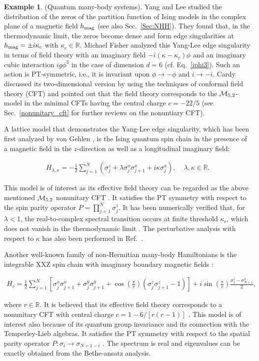 \documentclass{tADP2e}
\theoremstyle{plain}
\newcommand{\eqn}[1]{
\begin{eqnarray}
	#1
\end{eqnarray}
}
\theoremstyle{plain}
\theoremstyle{definition}
\newtheorem{example}{Example}[section]
\newcommand{\exmp}[1]{
\begin{example}
	#1
\end{example}
}
\begin{document}
\exmp{\label{phmany}(Quantum many-body systems).
Yang and Lee studied the distribution of the zeros of the partition function of Ising models in the complex plane of a magnetic field $h_{\rm mag}$ \cite{LTD52} (see also Sec.~\ref{Sec:NHH}). They found that, in the thermodynamic limit, the zeros become dense and form edge singularities at $h_{\rm mag}=\pm i\kappa_c$ with $\kappa_c\in{\mathbb R}$. Michael Fisher analyzed this Yang-Lee edge singularity in terms of field theory with an imaginary field $-i(\kappa-\kappa_c)\phi$ and an imaginary cubic interaction $ig\phi^3$ in the case of dimension $d=6$ \cite{MEF78} (cf. Eq.~\eqref{iphi3}). Such an action is PT-symmetric, i.e., it is invariant upon $\phi\to-\phi$ and $i\to -i$. Cardy discussed its two-dimensional version by using the techniques of conformal field theory (CFT) and pointed out that the field theory corresponds to the ${\cal M}_{5,2}$-model in the minimal CFTs \cite{JC85} having the central charge $c=-22/5$ (see  Sec.~\ref{nonunitary_cft} for further reviews on the nonuntiary CFT).

A lattice model that demonstrates the Yang-Lee edge singularity, which has been first analyzed by von Gehlen \cite{GvG91}, is the Ising quantum spin chain in the presence of a magnetic field in the $z$-direction as well as a longitudinal imaginary field:
\eqn{
H_{\lambda,\kappa}=-\frac{1}{2}\sum_{j=1}^N(\sigma_j^z+\lambda\sigma_j^x\sigma_{j+1}^x+i\kappa\sigma_j^x),\;\;\;\;\lambda,\kappa\in{\mathbb R}.
}
This model is of interest as its effective field theory can be regarded as the above mentioned ${\cal M}_{5,2}$ nonunitary CFT \cite{JC85}. It satisfies the PT symmetry with respect to the spin parity operator $P=\prod_{j=1}^N \sigma_j^z$. It has been numerically verified that, for $\lambda<1$, the real-to-complex spectral transition occurs at finite threshold $\kappa_c$, which does not vanish in the thermodynamic limit \cite{GvG91}. The perturbative analysis with respect to $\kappa$ has also been performed in Ref.~\cite{OAC09}. 

Another well-known family of non-Hermitian many-body Hamiltonians is the integrable XXZ spin chain with imaginary boundary magnetic fields \cite{VP90}:
\eqn{\label{xxzps}
H_{r}=\frac{1}{2}\sum_{j=1}^{N}\left[\sigma_j^x\sigma_{j+1}^x+\sigma_j^y\sigma_{j+1}^y+\cos\left(\frac{\pi}{r}\right)(\sigma_j^z\sigma_{j+1}^z-1)\right]+i\sin\left(\frac{\pi}{r}\right)\frac{\sigma_1^z-\sigma_{N+1}^z}{2},
}
where $r\in{\mathbb R}$. It is believed that its effective field theory corresponds to a nonunitary CFT with central charge $c=1-6/[r(r-1)]$ \cite{FCA87,VP90}. This model is of interest also because of its quantum group invariance and its connection with the Temperley-Lieb algebras. It satisfies the PT symmetry with respect to the spatial parity operator $P: \sigma_{i}\to\sigma_{N+1-i}$ \cite{KC072}. The spectrum is real and eigenvalues can be exactly obtained from the Bethe-ansatz analysis. 

}
\end{document}
